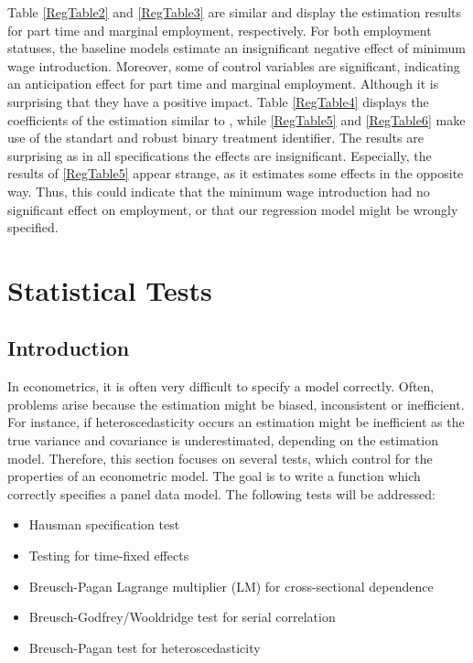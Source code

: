 \documentclass[a4paper]{article}
\begin{document}
{Table \ref{RegTable2} and \ref{RegTable3} are similar and display the estimation results for part time and marginal employment, respectively. For both employment statuses, the baseline models estimate an insignificant negative effect of minimum wage introduction. Moreover, some of control variables are significant, indicating an anticipation effect for part time and marginal employment. Although it is surprising that they have a positive impact. \newline
Table \ref{RegTable4} displays the coefficients of the estimation similar to \cite{schmitz2017effects}, while \ref{RegTable5} and \ref{RegTable6} make use of the standart and robust binary treatment identifier. The results are surprising as in all specifications the effects are insignificant. Especially, the results of \ref{RegTable5} appear strange, as it estimates some effects in the opposite way. Thus, this could indicate that the minimum wage introduction had no significant effect on employment, or that our regression model might be wrongly specified.

\section{Statistical Tests}
\subsection{Introduction}
In econometrics, it is often very difficult to specify a model correctly. Often, problems arise because the estimation might be biased, inconsistent or inefficient. For instance, if heteroscedasticity occurs an estimation might be inefficient as the true variance and covariance is underestimated, depending on the estimation model. Therefore, this section focuses on several tests, which control for the properties of an econometric model. The goal is to write a function which correctly specifies a panel data model. The following tests will be addressed:
\begin{itemize}
\item Hausman specification test
\item Testing for time-fixed effects
\item Breusch-Pagan Lagrange multiplier (LM) for cross-sectional dependence
\item Breusch-Godfrey/Wooldridge test for serial correlation
\item Breusch-Pagan test for heteroscedasticity
\end{itemize}

}
\end{document}
